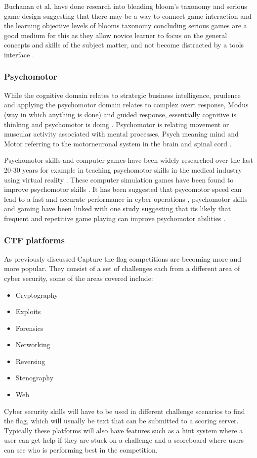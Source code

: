 \documentclass[12pt,a4paper]{article}
\begin{document}
Buchanan et al. have done research into blending bloom's taxonomy and serious game design suggesting that there may be a way to connect game interaction and the learning objective levels of blooms taxonomy concluding serious games are a good medium for this as they allow novice learner to focus on the general concepts and skills of the subject matter, and not become distracted by a tools interface \cite{buchanan2011blending2}. 
\subsubsection{Psychomotor} 
While the cognitive domain relates to strategic business intelligence, prudence and applying the psychomotor domain relates to complex overt response, Modus (way in which anything is done) and guided response, essentially cognitive is thinking and psychomotor is doing \cite{schutte2016development}. Psychomotor is relating movement or muscular activity associated with mental processes, Psych meaning mind and Motor referring to the motorneuronal system in the brain and spinal cord \cite{tan2007psychomotor}. 
 
Psychomotor skills and computer games have been widely researched over the last 20-30 years for example in teaching psychomotor skills in the medical industry using virtual reality \cite{westwood1998validation} \cite{gallagher2001objective} \cite{gallagher2002virtual} \cite{grantcharov2004randomized} \cite{lehmann2005prospective}. These computer simulation games have been found to improve psychomotor skills \cite{mitchell2004use}. It has been suggested that psycomotor speed can lead to a fast and accurate performance in cyber operations \cite{campbell2015identifying}, psychomotor skills and gaming have been linked with one study suggesting that its likely that frequent and repetitive game playing can improve psychomotor abilities \cite{kennedy2011video}.



\subsubsection{CTF platforms}
As previously discussed Capture the flag competitions are becoming more and more popular. They consist of a set of challenges each from a different area of cyber security, some of the areas covered include: 
\begin{itemize}
  \item Cryptography
  \item Exploits 
  \item Forensics 
  \item Networking 
  \item Reversing 
  \item Stenography  
  \item Web
\end{itemize}
Cyber security skills will have to be used in different challenge scenarios to find the flag, which will usually be text that can be submitted to a scoring server\cite{burket2015automatic}. Typically these platforms will also have features such as a hint system where a user can get help if they are stuck on a challenge and a scoreboard where users can see who is performing best in the competition.   
\end{document}

